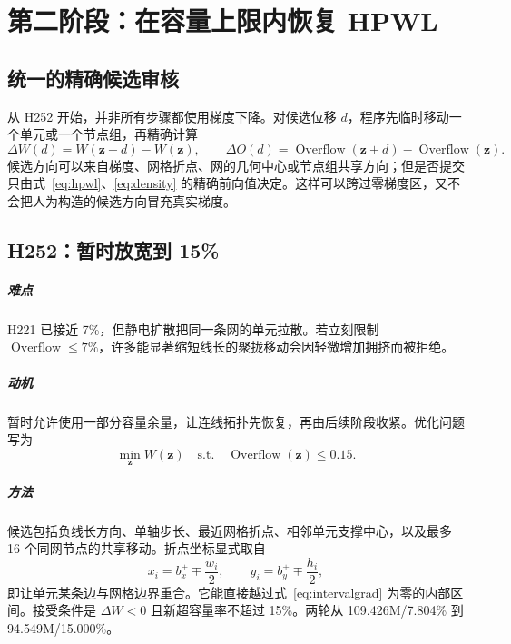 \documentclass[UTF8,a4paper,11pt]{ctexrep}
\newcommand{\Overflow}{\operatorname{Overflow}}
\begin{document}
\chapter{第二阶段：在容量上限内恢复 HPWL}
\section{统一的精确候选审核}
从 H252 开始，并非所有步骤都使用梯度下降。对候选位移 $d$，程序先临时移动一个单元或一个节点组，再精确计算
\begin{equation}
 \Delta W(d)=W(\bm z+d)-W(\bm z),\qquad
 \Delta O(d)=\Overflow(\bm z+d)-\Overflow(\bm z). \label{eq:exactdelta}
\end{equation}
候选方向可以来自梯度、网格折点、网的几何中心或节点组共享方向；但是否提交只由式~\eqref{eq:hpwl}、\eqref{eq:density} 的精确前向值决定。这样可以跨过零梯度区，又不会把人为构造的候选方向冒充真实梯度。

\section{H252：暂时放宽到 15\%}
\paragraph{难点}
H221 已接近 7\%，但静电扩散把同一条网的单元拉散。若立刻限制 $\Overflow\le7\%$，许多能显著缩短线长的聚拢移动会因轻微增加拥挤而被拒绝。

\paragraph{动机}
暂时允许使用一部分容量余量，让连线拓扑先恢复，再由后续阶段收紧。优化问题写为
\begin{equation}
 \min_{\bm z} W(\bm z)\quad\text{s.t.}\quad \Overflow(\bm z)\le0.15. \label{eq:cap15}
\end{equation}

\paragraph{方法}
候选包括负线长方向、单轴步长、最近网格折点、相邻单元支撑中心，以及最多 16 个同网节点的共享移动。折点坐标显式取自
\begin{equation}
 x_i=b_x^\pm\mp\frac{w_i}{2},\qquad
 y_i=b_y^\pm\mp\frac{h_i}{2}, \label{eq:breakpoints}
\end{equation}
即让单元某条边与网格边界重合。它能直接越过式~\eqref{eq:intervalgrad} 为零的内部区间。接受条件是 $\Delta W<0$ 且新超容量率不超过 15\%。两轮从 109.426M/7.804\% 到 94.549M/15.000\%。
\end{document}
